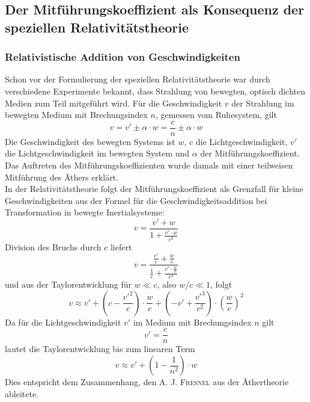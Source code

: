 \subsection{Der Mitführungskoeffizient als Konsequenz der speziellen Relativitätstheorie}

\subsubsection*{Relativistische Addition von Geschwindigkeiten}
Schon vor der Formulierung der speziellen Relativitätstheorie war durch verschiedene Experimente bekannt,
dass Strahlung von bewegten, optisch dichten Medien zum Teil mitgeführt wird.
Für die Geschwindigkeit $v$ der Strahlung im bewegten Medium mit Brechungsindex $n$, gemessen vom Ruhesystem,
gilt
\begin{equation}
\label{eq:mitf}
v = v' \pm \alpha \cdot w = \frac{c}{n} \pm \alpha \cdot w
\end{equation}
Die Geschwindigkeit des bewegten Systems ist $w$, $c$ die Lichtgeschwindigkeit,
$v'$ die Lichtgeschwindigkeit im bewegten System und
$\alpha$ der Mitführungskoeffizient.
Das Auftreten des Mitführungskoeffizienten wurde damals mit einer teilweisen Mitführung des Äthers erklärt.\\
In der Relativitätstheorie folgt der Mitführungskoeffizient als Grenzfall für kleine Geschwindigkeiten
aus der Formel für die Geschwindigkeitsaddition bei Transformation in bewegte Inertialsysteme:
\begin{equation}
\label{}
v=\frac{v'+w}{1+\frac{v' \cdot w}{c^2}}
\end{equation}
Division des Bruchs durch $c$ liefert
\begin{equation}
\label{}
v=\frac{\frac{v'}{c}+\frac{w}{c}}{\frac{1}{c}+\frac{v' \cdot \frac{w}{c}}{c^2}}
\end{equation} 
und aus der Taylorentwicklung für $w \ll c$, also $w/c \ll 1$, folgt
\begin{equation}
\label{}
v \approx v' + (c-\frac{v'^2}{c})\cdot \frac{w}{c}+ (-v'+\frac{v'^3}{c^2})\cdot \left(\frac{w}{c}\right)^2
\end{equation}
Da für die Lichtgeschwindigkeit $v'$ im Medium mit Brechungsindex $n$ gilt
\begin{equation}
\label{}
v'=\frac{c}{n}
\end{equation}
lautet die Taylorentwicklung bis zum linearen Term
\begin{equation}
\label{}
v \approx v' + (1-\frac{1}{n^2})\cdot w
\end{equation}
Dies entspricht dem Zusammenhang, den A. J. \textsc{Fresnel} aus der Äthertheorie ableitete.

